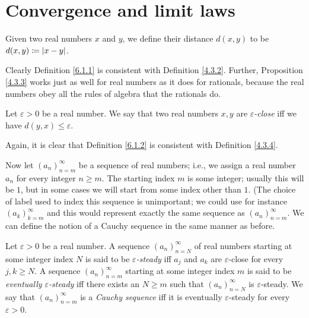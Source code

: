 \section{Convergence and limit laws}

\begin{definition}\label{6.1.1}
Given two real numbers \(x\) and \(y\), we define their distance \(d(x, y)\) to be \(d(x, y) \coloneqq \abs*{x - y}\).
\end{definition}

\begin{note}
Clearly Definition \ref{6.1.1} is consistent with Definition \ref{4.3.2}.
Further, Proposition \ref{4.3.3} works just as well for real numbers as it does for rationals, because the real numbers obey all the rules of algebra that the rationals do.
\end{note}

\begin{definition}\label{6.1.2}
Let \(\varepsilon > 0\) be a real number.
We say that two real numbers \(x, y\) are \emph{\(\varepsilon\)-close} iff we have \(d(y, x) \leq \varepsilon\).
\end{definition}

\begin{note}
Again, it is clear that Definition \ref{6.1.2} is consistent with Definition \ref{4.3.4}.
\end{note}

\begin{note}
Now let \((a_n)_{n = m}^\infty\) be a sequence of real numbers;
i.e., we assign a real number \(a_n\) for every integer \(n \geq m\).
The starting index \(m\) is some integer;
usually this will be \(1\), but in some cases we will start from some index other than \(1\).
(The choice of label used to index this sequence is unimportant; we could use for instance \((a_k)_{k = m}^{\infty}\) and this would represent exactly the same sequence as \((a_n)_{n = m}^{\infty}\).
We can define the notion of a Cauchy sequence in the same manner as before.
\end{note}

\begin{definition}\label{6.1.3}
Let \(\varepsilon > 0\) be a real number.
A sequence \((a_n)_{n = N}^\infty\) of real numbers starting at some integer index \(N\) is said to be \emph{\(\varepsilon\)-steady} iff \(a_j\) and \(a_k\) are \(\varepsilon\)-close for every \(j, k \geq N\).
A sequence \((a_n)_{n = m}^\infty\) starting at some integer index \(m\) is said to be \emph{eventually \(\varepsilon\)-steady} iff there exists an \(N \geq m\) such that \((a_n)_{n = N}^\infty\) is \(\varepsilon\)-steady.
We say that \((a_n)_{n = m}^\infty\) is a \emph{Cauchy sequence} iff it is eventually \(\varepsilon\)-steady for every \(\varepsilon > 0\).
\end{definition}

